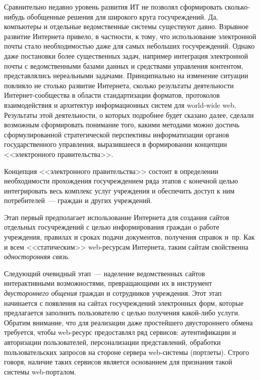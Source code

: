 \begin{multicols}{2}
Сравнительно недавно уровень развития ИТ не позволял сформировать сколько-нибудь
обобщенные решения для широкого круга госучреждений. Да, компьютеры и отдельные
ведомственные сис\-те\-мы существуют давно. Взрывное развитие Интернета привело, в
частности, к тому, что использование электронной почты стало необходимостью даже для
самых небольших госучреждений. Однако даже постановки более существенных задач,
например интеграция электронной почты с ведомственными базами данных и средствами
управления контентом, представлялись нереальными задачами. Принципиально на
изменение ситуации повлияло не столько развитие Интернета, сколько результаты
деятельности Интернет-сообщества в области стандартизации форматов, протоколов
взаимодействия и архитектур информационных систем для world-wide web. Результаты
этой деятельности, о которых подробнее будет сказано далее, сделали возможным
сформировать понимание того, какими методами можно достичь сформулированной
стратегической перспективы информатизации органов государственного управления,
выразившееся в формировании концепции <<электронного правительства>>.

Концепция <<электронного правительства>> состоит в определении необходимости
прохождения госучреждением ряда этапов с конечной целью интегрировать весь
комплекс услуг учреждения и обеспечить доступ к ним потребителей~--- граждан и
других учреждений.

Этап первый предполагает использование Интернета для создания сайтов отдельных
гос\-уч\-реж\-де\-ний с целью информирования граждан о работе учреждения, правилах и
сроках подачи документов, получения справок и~пр. Как и всем <<статическим>>
web-ресурсам Интернета, таким сайтам свойственна \textit{односторонняя связь}.

Следующий очевидный этап~--- наделение ведом\-ст\-вен\-ных сайтов интерактивными
возможностями, превращающими их в инструмент \textit{двустороннего общения}
граждан и сотрудников учреждения. Этот этап начинается с появления на сайтах
госучреждений электронных форм, которые предлагается заполнить пользователю с
целью получения ка\-кой-ли\-бо услуги. Обратим внимание, что для реализации даже
простейшего двустороннего обмена требуется, чтобы web-ре\-сурс предоставлял ряд
сервисов: аутентификации и авторизации пользователей, персонализации пред\-став\-ле\-ний,
обработки пользовательских запросов на стороне сервера web-сис\-те\-мы (портлеты). Строго
говоря, наличие таких сервисов является основанием для признания такой системы
web-пор\-та\-лом.


\end{multicols}

